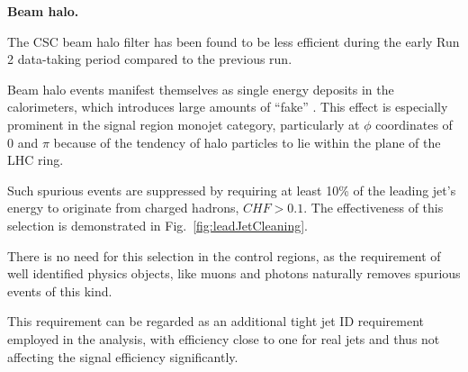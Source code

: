 

{\bf Beam halo.}

The CSC beam halo filter has been found to be less efficient during the early
Run 2 data-taking period compared to the previous run.

Beam halo events manifest themselves as single energy deposits in the
calorimeters, which introduces large amounts of ``fake'' \met. This effect is
especially prominent in the signal region monojet category, particularly at
$\phi$ coordinates of 0 and $\pi$ because of the tendency of halo particles to
lie within the plane of the LHC ring. 

Such spurious events are suppressed by requiring at least 10\% of the leading
jet's energy to originate from charged hadrons, $CHF>0.1$. The effectiveness of this selection
is demonstrated in Fig.~\ref{fig:leadJetCleaning}.

There is no need for this selection in the control regions, 
as the requirement of well identified physics objects, like muons 
and photons naturally removes spurious events of this kind. 

This requirement can be regarded as 
an additional tight jet ID requirement employed in the analysis, 
with efficiency close to one for real jets and thus not affecting the 
signal efficiency significantly. 


